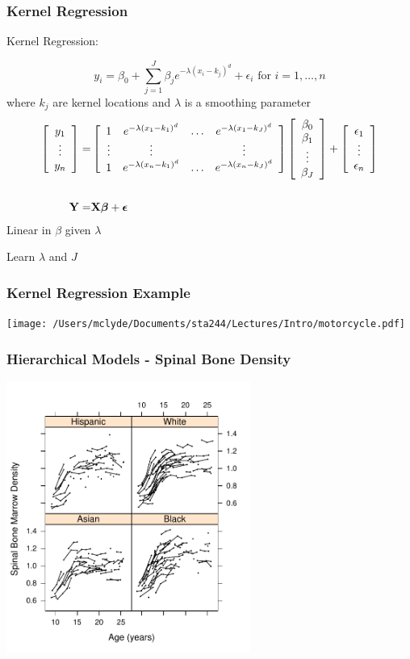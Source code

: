 \documentclass[handout]{beamer}\usepackage[]{graphicx}\usepackage[]{color}
\begin{document}
\begin{frame} \frametitle{Kernel  Regression}
Kernel  Regression:

$$y_i =  \beta_0 + \sum_{j = 1}^J \beta_j e^{-\lambda (x_i - k_j)^d} + \epsilon_i \text{  for  } i = 1, \ldots, n$$
where $k_j$ are kernel locations and $\lambda$ is a smoothing parameter
\pause
\begin{eqnarray*}
\left[
\begin{array}{c}  y_1 \\ \vdots \\  y_n \end{array}
  \right]   =  &
 \left[ \begin{array}{cccc}  1 &  e^{-\lambda (x_1 - k_1)^d} &
     \ldots &  e^{-\lambda (x_1 - k_J)^d}  \\
     \vdots & \vdots & & \vdots \\ 1 & e^{-\lambda (x_n - k_1)^d} &  \ldots & e^{-\lambda (x_n - k_J)^d} \end{array}  \right]
 \left[ \begin{array}{c}  \beta_0  \\  \beta_1 \\\vdots \\ \beta_J \end{array}
 \right] +
\left[ \begin{array}{c}  \epsilon_1 \\ \vdots \\ \epsilon_n  \end{array}
\right] \\
 & \\
\mathbf{Y} = & \mathbf{X} \boldsymbol{\beta} + \boldsymbol{\epsilon}
\end{eqnarray*} \pause
Linear in $\beta$ given $\lambda$ \\  \pause

Learn $\lambda$  and $J$


\end{frame}

\begin{frame}
  \frametitle{Kernel Regression Example}
  \texttt{[image: /Users/mclyde/Documents/sta244/Lectures/Intro/motorcycle.pdf]}
\end{frame}
\begin{frame}
  \frametitle{Hierarchical Models - Spinal Bone Density}
\centerline{  \includegraphics[height=3.5in]{spinalbone}}
\end{frame}
\end{document}
